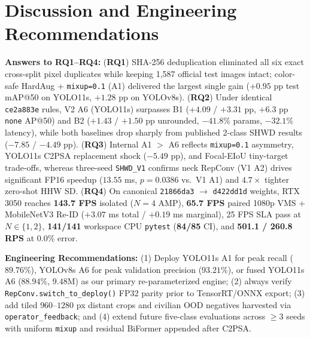 \section{Discussion and Engineering Recommendations}

\noindent\textbf{Answers to RQ1--RQ4:} (\textbf{RQ1}) SHA-256 deduplication eliminated all six exact cross-split pixel duplicates while keeping 1,587 official test images intact; color-safe HardAug + \texttt{mixup=0.1} (A1) delivered the largest single gain ($+0.95$ pp test mAP@50 on YOLO11s, $+1.28$ pp on YOLOv8s). (\textbf{RQ2}) Under identical \texttt{ce2a883e} rules, V2 A6 (YOLO11s) surpasses B1 ($+4.09$ / $+3.31$ pp, $+6.3$ pp \texttt{none} AP@50) and B2 ($+1.43$ / $+1.50$ pp unrounded, $-41.8\%$ params, $-32.1\%$ latency), while both baselines drop sharply from published 2-class SHWD results ($-7.85$ / $-4.49$ pp). (\textbf{RQ3}) Internal A1 $>$ A6 reflects \texttt{mixup=0.1} asymmetry, YOLO11s C2PSA replacement shock ($-5.49$ pp), and Focal-EIoU tiny-target trade-offs, whereas three-seed \texttt{SHWD\_V1} confirms neck RepConv (V1 A2) drives significant FP16 speedup ($13.55$ ms, $p=0.0386$ vs.\ V1 A1) and $4.7\times$ tighter zero-shot HHW SD. (\textbf{RQ4}) On canonical \texttt{21866da3} $\to$ \texttt{d422dd1d} weights, RTX 3050 reaches \textbf{143.7 FPS} isolated ($N=4$ AMP), \textbf{65.7 FPS} paired 1080p VMS + MobileNetV3 Re-ID ($+3.07$ ms total / $+0.19$ ms marginal), 25 FPS SLA pass at $N \in \{1, 2\}$, \textbf{141/141} workspace CPU \texttt{pytest} (\textbf{84/85} CI), and \textbf{501.1 / 260.8 RPS} at 0.0\% error.

\noindent\textbf{Engineering Recommendations:} (1) Deploy YOLO11s A1 for peak recall ($89.76\%$), YOLOv8s A6 for peak validation precision ($93.21\%$), or fused YOLO11s A6 ($88.94\%$, $9.48\text{M}$) as our primary re-parameterized engine; (2) always verify \nolinkurl{RepConv.switch_to_deploy()} FP32 parity prior to TensorRT/ONNX export; (3) add tiled $960\text{--}1280$ px distant crops and civilian OOD negatives harvested via \nolinkurl{operator_feedback}; and (4) extend future five-class evaluations across $\ge 3$ seeds with uniform \texttt{mixup} and residual BiFormer appended after C2PSA.
